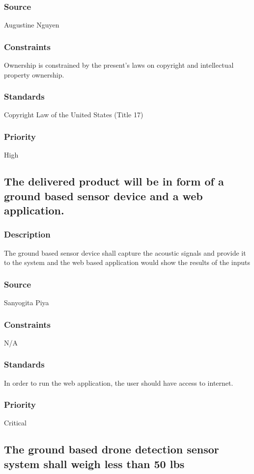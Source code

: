 \subsubsection{Source}
Augustine Nguyen
\subsubsection{Constraints}
Ownership is constrained by the present's laws on copyright and intellectual property ownership.
\subsubsection{Standards}
Copyright Law of the United States (Title 17)
\subsubsection{Priority}
High

\subsection{The delivered product will be in form of a ground based sensor device and a web application.}
\subsubsection{Description}
The ground based sensor device shall capture the acoustic signals and provide it to the system and the web based application would show the results of the inputs
\subsubsection{Source}
Sanyogita Piya
\subsubsection{Constraints}
N/A
\subsubsection{Standards}
In order to run the web application, the user should have access to internet.
\subsubsection{Priority}
Critical

\subsection{The ground based drone detection sensor system shall weigh less than 50 lbs}
